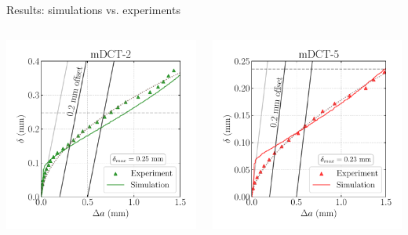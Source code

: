 \documentclass[9pt]{beamer}
\begin{document}
\begin{frame}{Results: simulations vs. experiments}

    \begin{columns}
        \centering
        \includegraphics[width=1.0\textwidth]{Images/plot_CTOD-da_mDCT2_X52.pdf}
        
        \centering
        \includegraphics[width=1.0\textwidth]{Images/plot_CTOD-da_mDCT5_X52.pdf}


\end{columns}
\end{frame}
\end{document}
